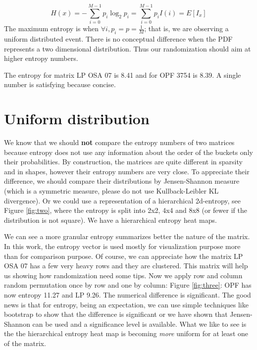 \documentclass[manuscript,screen]{acmart}
\begin{document}
\begin{equation}
  \label{eq:entropy}
  H(x) = -\sum_{i=0}^{M-1} p_i\log_2p_i = \sum_{i=0}^{M-1}p_i I(i) =
  E[I_x]
\end{equation}
The maximum entropy is when $\forall i, p_i = p = \frac{1}{M}$; that
is, we are observing a uniform distributed event. There is no
conceptual difference when the PDF represents a two dimensional
distribution. Thus our randomization should aim at higher entropy
numbers.

The entropy for matrix LP OSA 07 is 8.41 and for OPF 3754 is 8.39. A
single number is satisfying because concise.  


\section{Uniform distribution}
\label{sec:uniform}
We know that we should {\bf not} compare the entropy numbers of two
matrices because entropy does not use any information about the order
of the buckets only their probabilities. By construction, the matrices
are quite different in sparsity and in shapes, however their entropy
numbers are very close. To appreciate their difference, we should
compare their distributions by Jensen-Shannon measure (which is a
symmetric measure, please do not use Kullback-Leibler KL
divergence). Or we could use a representation of a hierarchical
2d-entropy, see Figure \ref{fig:two}, where the entropy is split into
2x2, 4x4 and 8x8 (or fewer if the distribution is not square). We have
a hierarchical entropy heat maps.


We can see a more granular entropy summarizes better the nature of the
matrix. In this work, the entropy vector is used mostly for
visualization purpose more than for comparison purpose. Of course, we
can appreciate how the matrix LP OSA 07 has a few very heavy rows and
they are clustered. This matrix will help us showing how randomization
need some tips. Now we apply row and column random permutation once by
row and one by column: Figure \ref{fig:three}: OPF has now entropy
11.27 and LP 9.26. The numerical difference is significant. The good
news is that for entropy, being an expectation, we can use simple
techniques like bootstrap to show that the difference is significant
or we have shown that Jensen-Shannon can be used and a significance
level is available. What we like to see is the the hierarchical
entropy heat map is becoming {\em more} uniform for at least one of
the matrix.
\end{document}
